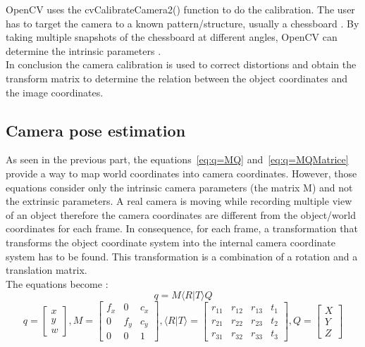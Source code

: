 OpenCV uses the cvCalibrateCamera2() function to do the calibration. The user has to target the camera to a known pattern/structure, usually a chessboard \cite{zhang_flexible_1999}. By taking multiple snapshots of the chessboard at different angles, OpenCV can determine the intrinsic parameters \cite{_camera_????}. \\

In conclusion the camera calibration is used to correct distortions and obtain the transform matrix to determine the relation between the object coordinates and the image coordinates.

\subsection{Camera pose estimation}

As seen in the previous part, the equations~\ref{eq:q=MQ} and~\ref{eq:q=MQMatrice} provide a way to map world coordinates into camera coordinates. However, those equations consider only the intrinsic camera parameters (the matrix M) and not the extrinsic parameters. A real camera is moving while recording multiple view of an object therefore the camera coordinates are different from the object/world coordinates for each frame. In consequence, for each frame, a transformation that transforms the object coordinate system into the internal camera coordinate system has to be found. This transformation is a combination of a rotation and a translation matrix. \\

The equations become \cite{_camera_????-1}: 
\begin{equation}
  q = M\langle R\vert T\rangle Q     
\end{equation}
\begin{equation}
  q = \begin{bmatrix}
       x \\
       y \\
       w 
     \end{bmatrix}, 
  M = \begin{bmatrix}
       f_x & 0 & c_x \\
       0 & f_y & c_y \\
       0 & 0 & 1
     \end{bmatrix}, 
  \langle R\vert T\rangle =  \begin{bmatrix}
       r_{11} & r_{12} & r_{13} & t_1 \\
       r_{21} & r_{22} & r_{23} & t_2\\
       r_{31} & r_{32} & r_{33} & t_3
     \end{bmatrix},  
  Q = \begin{bmatrix}
       X \\
       Y \\
       Z 
     \end{bmatrix}     
\end{equation}

